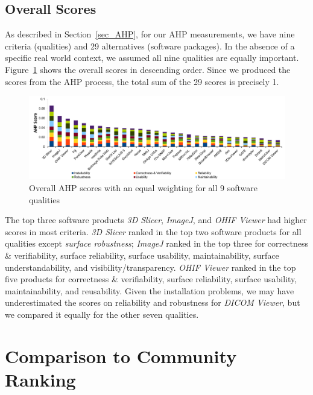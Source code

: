 \documentclass[final, 3p, times, authoryear]{elsarticle}
\begin{document}
\subsection{Overall Scores}

As described in Section~\ref{sec_AHP}, for our AHP measurements, we have nine
criteria (qualities) and 29 alternatives (software packages). In the absence of
a specific real world context, we assumed all nine qualities are equally
important. Figure~\ref{fg_overall_scores} shows the overall scores in descending
order. Since we produced the scores from the AHP process, the total sum of the
29 scores is precisely 1.

\begin{figure}[!ht]
\includegraphics[scale=0.48]{figures/overall_scores.pdf}
\caption{Overall AHP scores with an equal weighting for all 9 software qualities}

\label{fg_overall_scores}
\end{figure}

The top three software products \textit{3D Slicer}, \textit{ImageJ}, and
\textit{OHIF Viewer} had higher scores in most criteria. \textit{3D Slicer}
ranked in the top two software products for all qualities except \textit{surface
robustness}; \textit{ImageJ} ranked in the top three for correctness \&
verifiability, surface reliability, surface usability, maintainability, surface
understandability, and visibility/transparency. \textit{OHIF Viewer} ranked in
the top five products for correctness \& verifiability, surface reliability,
surface usability, maintainability, and reusability. Given the installation
problems, we may have underestimated the scores on reliability and robustness
for \textit{DICOM Viewer}, but we compared it equally for the other seven
qualities.

\section{Comparison to Community Ranking} \label{Sec_VsCommunityRanking}
\end{document}

